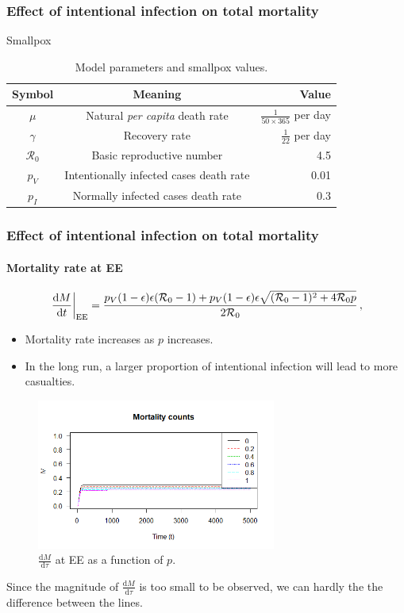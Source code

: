 \documentclass{beamer}
\newcommand\dbyd[2]{\frac{\mathrm d{#1}}{\mathrm d{#2}}}
\newcommand{\R}{\mathcal{R}}
\newcommand{\pmV}{p_{V}}
\newcommand{\pmI}{p_{I}}
\begin{document}
\begin{frame}
\frametitle{Effect of intentional infection on total mortality}
\begin{center}
Smallpox
\end{center}
\begin{table}[H]
\begin{center}
\caption{Model parameters and smallpox values.}
\label{tab:params}
\smallskip
\begin{tabular}{c|c|r}
{\bfseries Symbol} & {\bfseries Meaning} & {\bfseries Value} \\\hline
$\mu$ & Natural \emph{per capita} death rate & $\frac{1}{50\times365}$ per day \\
$\gamma$ & Recovery rate & $\frac{1}{22}$ per day \\
$\R_0$ & Basic reproductive number & 4.5\\
$\pmV$ & Intentionally infected cases death rate & 0.01\\
$\pmI$ & Normally infected cases death rate & 0.3
\end{tabular}
\end{center}
\end{table}
\end{frame}
\begin{frame}
\frametitle{Effect of intentional infection on total mortality}
\framesubtitle{Mortality rate at EE}
\begin{equation}
\left. \dbyd{M}{t}\right|_{\rm EE}=\frac{\pmV(1-\epsilon)\epsilon(\R_0 -1)+ \pmV(1-\epsilon)\epsilon \sqrt{(\R_0-1)^2+4\R_0 p}}{2\R_0}\,,
\end{equation}
\pause
\begin{itemize}
\item Mortality rate increases as $p$ increases.
\pause
\item In the long run, a larger proportion of intentional infection will lead to more casualties.
\end{itemize}
\end{frame}
\begin{frame}
\begin{figure}[H]
  \centering
  \includegraphics[width=0.7\textwidth]{Figures/Mortality_counts.png}
  \caption{$\dbyd{M}{\tau}$ at EE as a function of $p$.}
\label{fig:dMdt}
\end{figure}

Since the magnitude of $\dbyd{M}{\tau}$ is too small to be observed, we can hardly the the difference between the lines.
\end{frame}
\end{document}
